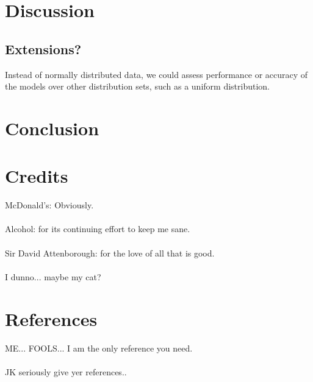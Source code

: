 \documentclass[11pt, oneside]{article}
\begin{document}
\pagebreak
\section*{Discussion}




\subsection*{Extensions?}
 Instead of normally distributed data, we could assess performance or accuracy of the models over other distribution sets, such as a uniform distribution.


\pagebreak
\section{Conclusion}



\section{Credits}
McDonald's: Obviously.\\
\\
Alcohol: for its continuing effort to keep me sane.\\
\\
Sir David Attenborough: for the love of all that is good.\\
\\
I dunno... maybe my cat?


\section*{References}
ME... FOOLS... I am the only reference you need.\\
\\
JK seriously give yer references..
\end{document}
